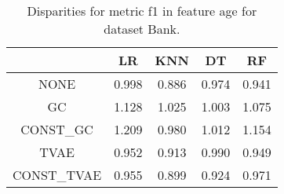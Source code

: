 \begin{table}
\caption{Disparities for metric f1 in feature age for dataset Bank.}
\label{tab:disp-BANK-age-f1}
\begin{tabular}{ccccc}
\toprule
 & LR & KNN & DT & RF \\
\midrule
NONE & 0.998 & 0.886 & 0.974 & 0.941 \\
GC & 1.128 & 1.025 & 1.003 & 1.075 \\
CONST\_GC & 1.209 & 0.980 & 1.012 & 1.154 \\
TVAE & 0.952 & 0.913 & 0.990 & 0.949 \\
CONST\_TVAE & 0.955 & 0.899 & 0.924 & 0.971 \\
\bottomrule
\end{tabular}
\end{table}
